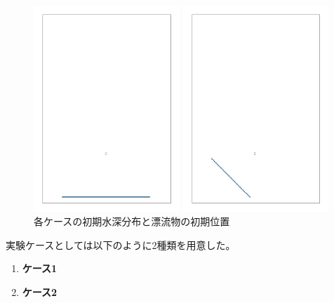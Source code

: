 \documentclass[12pt]{jsarticle}
\begin{document}
  \begin{figure}[H]
    \begin{center}
    \begin{minipage}[b]{0.45\linewidth}
      \centering
      \includegraphics[width=5.5cm]{images/car_init.png}
    \end{minipage}
    \begin{minipage}[b]{0.45\linewidth}
      \centering
      \includegraphics[width=5.5cm]{images/diag_car_init.png}
    \end{minipage}
    \end{center}
    \caption{各ケースの初期水深分布と漂流物の初期位置}
    \label{fig:car_init}
  \end{figure}

  実験ケースとしては以下のように2種類を用意した。

  \begin{enumerate}
    \item \textbf{ケース1}
    \item \textbf{ケース2}
  \end{enumerate}
\end{document}
